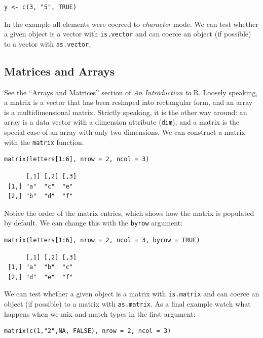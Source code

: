 \documentclass[captions=tableheading]{scrbook}
\begin{document}
\begin{verbatim}
y <- c(3, "5", TRUE)
\end{verbatim}


In the example all elements were coerced to \emph{character} mode. We can test whether a given object is a vector with \texttt{is.vector} and can coerce an object (if possible) to a vector with \texttt{as.vector}.
\subsection{Matrices and Arrays}
\label{sec-20-1-2}


See the ``Arrays and Matrices'' section of \emph{An Introduction to} \textsf{R}. Loosely speaking, a matrix is a vector that has been reshaped into rectangular form, and an array is a multidimensional matrix. Strictly speaking, it is the other way around: an array is a data vector with a dimension attribute (\texttt{dim}), and a matrix is the special case of an array with only two dimensions. We can construct a matrix with the \texttt{matrix} function. 


\begin{verbatim}
matrix(letters[1:6], nrow = 2, ncol = 3)
\end{verbatim}

\begin{verbatim}
      [,1] [,2] [,3]
 [1,] "a"  "c"  "e" 
 [2,] "b"  "d"  "f"
\end{verbatim}

Notice the order of the matrix entries, which shows how the matrix is populated by default. We can change this with the \texttt{byrow} argument:


\begin{verbatim}
matrix(letters[1:6], nrow = 2, ncol = 3, byrow = TRUE)
\end{verbatim}

\begin{verbatim}
      [,1] [,2] [,3]
 [1,] "a"  "b"  "c" 
 [2,] "d"  "e"  "f"
\end{verbatim}

We can test whether a given object is a matrix with \texttt{is.matrix} and can coerce an object (if possible) to a matrix with \texttt{as.matrix}. As a final example watch what happens when we mix and match types in the first argument:


\begin{verbatim}
matrix(c(1,"2",NA, FALSE), nrow = 2, ncol = 3)
\end{verbatim}
\end{document}
